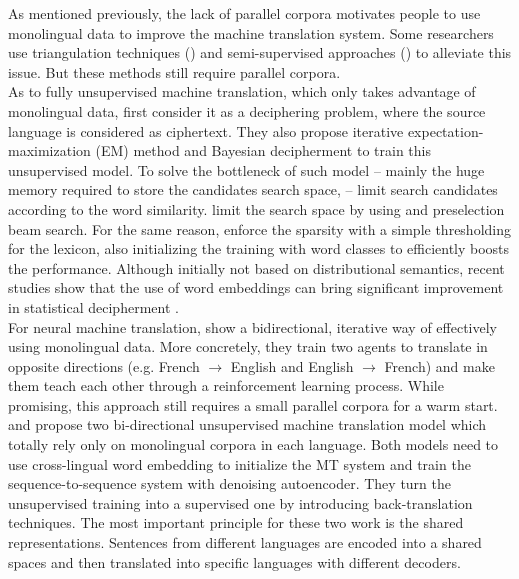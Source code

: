 As mentioned previously, the lack of parallel corpora motivates people to use monolingual data to improve the machine translation system. Some researchers use triangulation techniques (\cite{cohn2007machine}) and semi-supervised approaches (\cite{DBLP:journals/corr/ChengXHHWSL16}) to alleviate this issue. But these methods still require parallel corpora.\\
As to fully unsupervised machine translation, which only takes advantage of monolingual data, \cite{ravi2011deciphering} first consider it as a deciphering problem, where the source language is considered as ciphertext. They also propose iterative expectation-maximization (EM) method and Bayesian decipherment to train this unsupervised model. To solve the bottleneck of such model -- mainly the huge memory required to store the candidates search space, -- \cite{nuhn2012deciphering} limit search candidates according to the word similarity. \cite{nuhn2014decipherment} limit the search space by using and preselection beam search. For the same reason, \cite{kim2017unsupervised} enforce the sparsity with a simple thresholding for the lexicon, also initializing the training with word classes to efficiently boosts the performance. 
Although initially not based on distributional semantics, recent studies show that the use of word embeddings can bring significant improvement in statistical decipherment \cite{duong2016learning}.\\
For neural machine translation, \cite{he2016dual} show a bidirectional, iterative way of effectively using monolingual data. More concretely, they train two agents to translate in opposite directions (e.g. French ${\rightarrow}$ English and English ${\rightarrow}$ French) and make them teach each other through a reinforcement learning process. While promising, this approach still requires a small parallel corpora for a warm start.  
\cite{artetxe2017unsupervised} and \cite{lample2017unsupervised} propose two bi-directional unsupervised machine translation model which totally rely only on monolingual corpora in each language. Both models  need to use cross-lingual word embedding to initialize the MT system and train the sequence-to-sequence system with denoising autoencoder. They turn the unsupervised training into a supervised one by introducing back-translation techniques. The most important principle for these two work is the shared representations. Sentences from different languages are encoded into a shared spaces and then translated into specific languages with different decoders.
